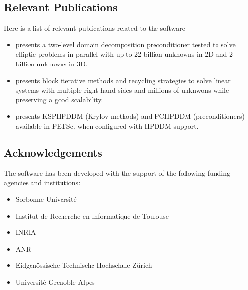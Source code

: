 \subsection{Relevant Publications}
\label{sec:HPDDM:publications}

Here is a list of relevant publications related to the software:
\begin{itemize}
\item {} presents a two-level domain decomposition preconditioner tested to solve elliptic problems in parallel with up to 22 billion unknowns in 2D and 2 billion unknowns in 3D.
\item {} presents block iterative methods and recycling strategies to solve linear systems with multiple right-hand sides and millions of unknwons while preserving a good scalability.
\item {} presents KSPHPDDM (Krylov methods) and PCHPDDM (preconditioners) available in PETSc, when configured with HPDDM support.
\end{itemize}
  

\subsection{Acknowledgements}
\label{sec::HPDDM:acknowledgements}

The software has been developed with the support of the following funding agencies and institutions: 

\begin{itemize}
\item Sorbonne Université
\item Institut de Recherche en Informatique de Toulouse
\item INRIA
\item ANR
\item Eidgenössische Technische Hochschule Zürich
\item Université Grenoble Alpes
\end{itemize}
